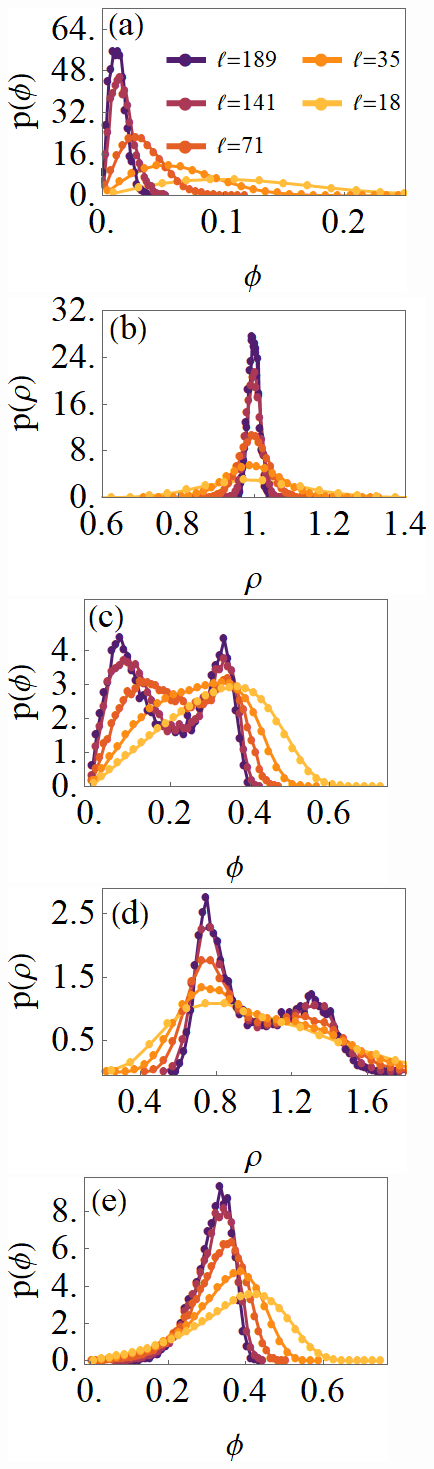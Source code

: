 \documentclass[twoside,twocolumn,9pt]{article}
\begin{document}
\begin{figure}[ht]
	\centering
	\includegraphics[width=0.48\columnwidth]{PDF_rho_dt=0.005_e=0.5500.png}
	\includegraphics[width=0.50\columnwidth] {PDF_phi_dt=0.005_e=0.5500.png}\vspace{4mm}
	\includegraphics[width=0.48\columnwidth]{PDF_rho_dt=0.005_e=0.4890.png}
	\includegraphics[width=0.50\columnwidth]{PDF_phi_dt=0.005_e=0.4890.png}\vspace{4mm}
	\includegraphics[width=0.48\columnwidth]{PDF_rho_dt=0.005_e=0.4850.png}

\end{figure}
\end{document}
